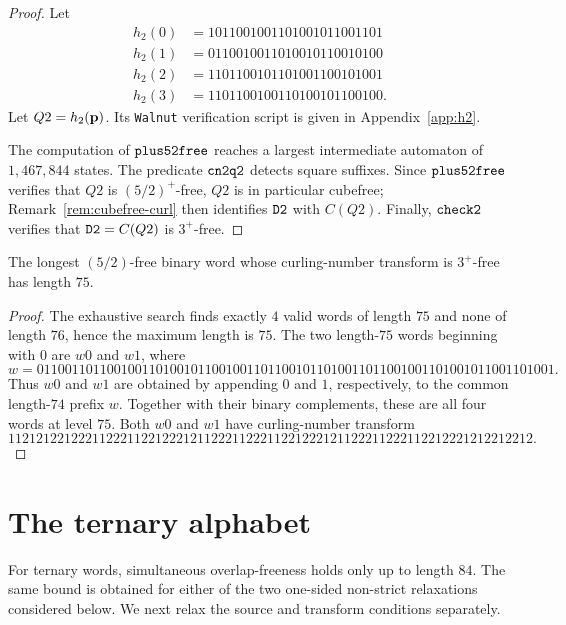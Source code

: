 \documentclass[12pt,reqno]{article}
\begin{document}
\begin{proof} 
Let
\begin{align*} 
h_2(0) &= 1011001001101001011001101 \\
h_2(1) &= 0110010011010010110010100 \\
h_2(2) &= 1101100101101001100101001 \\
h_2(3) &= 1101100100110100101100100 .
\end{align*}
Let $Q2=h_2({\bf p})$.  Its {\tt Walnut} verification script is given in Appendix~\ref{app:h2}.

The computation of ${\tt plus52free}$ reaches a largest intermediate automaton of $1{,}467{,}844$ states.  The predicate ${\tt cn2q2}$ detects square suffixes.  Since ${\tt plus52free}$ verifies that $Q2$ is $(5/2)^+$-free, $Q2$ is in particular cubefree; Remark~\ref{rem:cubefree-curl} then identifies ${\tt D2}$ with $C(Q2)$.  Finally, ${\tt check2}$ verifies that ${\tt D2}=C(Q2)$ is $3^+$-free.
\end{proof}

\begin{theorem} 
\label{thm:binary-52-3plus-max}
The longest $(5/2)$-free binary word whose curling-number transform is $3^+$-free has length $75$. 
\end{theorem}

\begin{proof} 
The exhaustive search finds exactly $4$ valid words of length $75$ and none of length $76$, hence the maximum length is $75$.  The two length-$75$ words beginning with $0$ are $w0$ and $w1$, where
$$w = 01100110110010011010010110010011011001011010011011001001101001011001101001.$$
Thus $w0$ and $w1$ are obtained by appending $0$ and $1$, respectively, to the common length-$74$ prefix $w$.  Together with their binary complements, these are all four words at level $75$.  Both $w0$ and $w1$ have curling-number transform
$$112121221222112221122122212112221122211221222121122211222112212221212212212.$$
\end{proof}


\section{The ternary alphabet}
\label{sec:ternary}

For ternary words, simultaneous overlap-freeness holds only up to length $84$.  The same bound is obtained for either of the two one-sided non-strict relaxations considered below.  We next relax the source and transform conditions separately.
\end{document}
